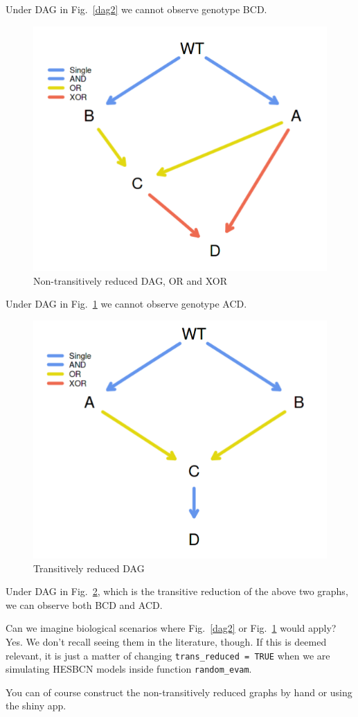 \documentclass[a4paper,11pt]{article}
\begin{document}
Under DAG in Fig.~\ref{dag2} we cannot observe genotype BCD.

\begin{figure}[h!]
\centering
\includegraphics[width=.23\linewidth]{./dag3.png}
\caption{Non-transitively reduced DAG, OR and XOR}\label{dag3}
\end{figure}

Under DAG in Fig.~\ref{dag3} we cannot observe genotype ACD.


\begin{figure}[h!]
\centering
\includegraphics[width=.23\linewidth]{./dag1.png}
\caption{Transitively reduced DAG}\label{dag1}
\end{figure}

Under DAG in Fig.~\ref{dag1}, which is the transitive reduction of the above two graphs, we can observe both BCD and ACD.

Can we imagine biological scenarios where Fig.~\ref{dag2} or Fig.~\ref{dag3} would apply? Yes. We don't recall seeing them in the literature, though. If this is deemed relevant, it is just a matter of changing  \texttt{trans\_reduced = TRUE} when we are simulating HESBCN models inside function \texttt{random\_evam}.

You can of course construct the non-transitively reduced graphs by hand or using the shiny app.









\end{document}

